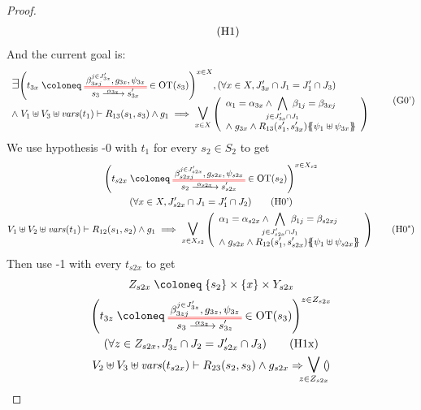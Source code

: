 \documentclass{article}
\begin{document}
\begin{proof}
\begin{gather}
\begin{array}{l}
{\begin{array}{l}
	\end{array}}
	\end{array} \hyp{1}
\end{gather}
And the current goal is:
\[
	\everymath{\displaystyle}\begin{array}{l}
	\bigsymb{\exists} \mpar{t_{3x} \defobject \OTx{3}{x}{3x}{3x} \in \fOT{s_3}}^{x \in X}, \mpar{\forall x \in X, J'_{3x} \cap J_1 = J'_1 \cap J_3} \\[-4pt]
	\nwedge V_1 \uplus V_3 \uplus \fvars{t_1} \vdash R_{13}\mpar{s_1, s_3} \wedge g_1 \implies \operatorname*{\bigsymb{\bigvee}}_{x \in X} \mpar{\begin{array}{l}
		\alpha_1 = \alpha_{3x} \wedge \bigwedge_\subbox{j \in J'_{3x} \cap J_1} \beta_{1j} = \beta_{3xj} \\[12pt]
		\nwedge g_{3x} \wedge R_{13}\mpar{s'_1, s'_{3x}}\psubst{\psi_1 \uplus \psi_{3x}}
	\end{array}}
	\end{array} \goal{0'}
\]
We use hypothesis \hyp{0} with \(t_1\) for every \(s_2 \in S_2\) to get
\begin{gather*}
	\mpar{t_{s2x} \defobject \OT{s_2}{s'_{s2x}}{\alpha_{s2x}}{\beta_{s2xj}^{j \in J'_{s2x}}}{g_{s2x}}{\psi_{s2x}} \in \fOT{s_2}}^{x \in X_{s2}} \\
	\mpar{\forall x \in X, J'_{s2x} \cap J_1 = J'_1 \cap J_2} \hyp{0'} \\
	V_1 \uplus V_2 \uplus \fvars{t_1} \vdash R_{12}\mpar{s_1, s_2} \wedge g_1 \implies \operatorname*{\bigsymb{\bigvee}}_{x \in X_{s2}} \mpar{\everymath{\displaystyle}\begin{array}{l}
		\alpha_1 = \alpha_{s2x} \wedge \bigwedge_\subbox{j \in J'_{s2x} \cap J_1} \beta_{1j} = \beta_{s2xj} \\[12pt]
		\nwedge g_{s2x} \wedge R_{12}\mpar{s'_1, s'_{s2x}}\psubst{\psi_1 \uplus \psi_{s2x}}
	\end{array}} \hyp{0"}
\end{gather*}
Then use \hyp{1} with every \(t_{s2x}\) to get
\begin{gather*}
	Z_{s2x} \defobject \mbrc{s_2} \times \mbrc{x} \times Y_{s2x} \\
	\mpar{t_{3z} \defobject \OTx{3}{z}{3z}{3z} \in \fOT{s_3}}^{z \in Z_{s2x}} \\
	\mpar{\forall z \in Z_{s2x}, J'_{3z} \cap J_2 = J'_{s2x} \cap J_3} \hyp{1x} \\
	V_2 \uplus V_3 \uplus \fvars{t_{s2x}} \vdash R_{23}\mpar{s_2, s_3} \wedge g_{s2x} \Rightarrow \operatorname*{\bigsymb{\bigvee}}_\subbox{z \in Z_{s2x}} \mpar{\!\everymath{\displaystyle}\begin{array}{l}

\end{array}}
\end{gather*}
\end{proof}
\end{document}
